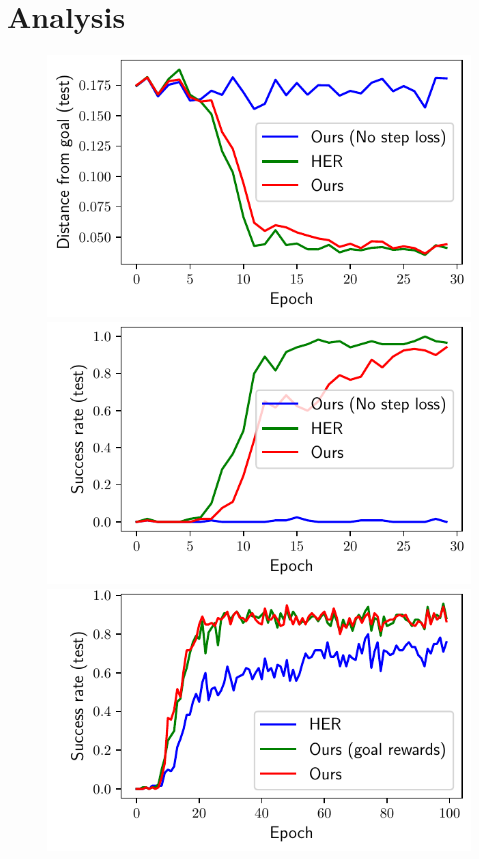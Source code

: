 \section{Analysis}
%
\begin{figure}%
  \def\frac{0.24}
  \includegraphics[width=\frac\columnwidth]{media/res/ablate-ddpg-with-without-step-loss/FetchPush-6efc1de-ddpgepoch-test/ag_g_dist.pdf}%
  \includegraphics[width=\frac\columnwidth]{media/res/ablate-ddpg-with-without-step-loss/FetchPush-6efc1de-ddpgepoch-test/success_rate.pdf}%
  \includegraphics[width=\frac\columnwidth]{media/res/ablate-ours-with-goal-reward/FetchPickAndPlace-dqstepoch-test/success_rate.pdf}%

\end{figure}
